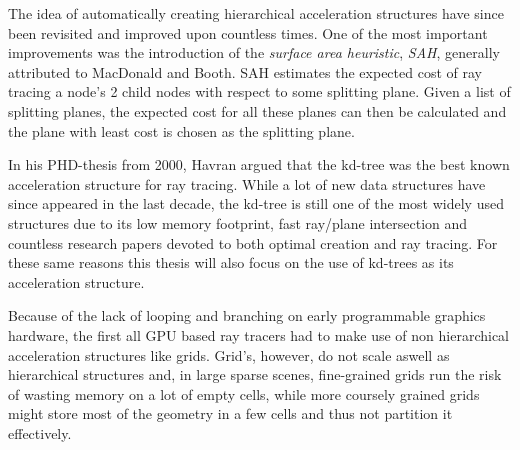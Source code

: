 
The idea of automatically creating hierarchical acceleration structures have
since been revisited and improved upon countless times. One of the most
important improvements was the introduction of the \textit{surface area
  heuristic}, \textit{SAH}, generally attributed to MacDonald and
Booth. SAH estimates the expected cost of ray tracing a
node's 2 child nodes with respect to some splitting plane. Given a list of
splitting planes, the expected cost for all these planes can then be calculated
and the plane with least cost is chosen as the splitting plane.



In his PHD-thesis from 2000, Havran argued that the kd-tree
was the best known acceleration structure for ray tracing. While a lot of new
data structures have since appeared in the last decade, the kd-tree is still one
of the most widely used structures due to its low memory footprint, fast
ray/plane intersection and countless research papers devoted to both optimal
creation and ray tracing. For these same reasons this thesis will also focus on
the use of kd-trees as its acceleration structure.




Because of the lack of looping and branching on early programmable graphics
hardware, the first all GPU based ray tracers had to make use of non
hierarchical acceleration structures like grids. Grid's,
however, do not scale aswell as hierarchical structures and, in large sparse
scenes, fine-grained grids run the risk of wasting memory on a lot of empty
cells, while more coursely grained grids might store most of the geometry in a
few cells and thus not partition it effectively.


